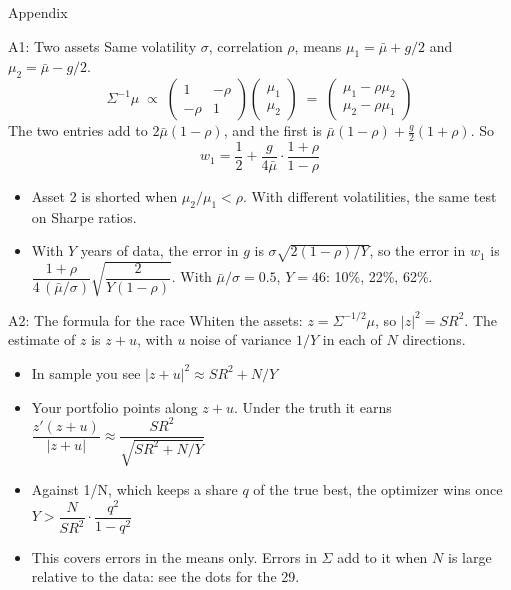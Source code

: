 \documentclass[aspectratio=169,10pt]{beamer}
\begin{document}
\appendix
\begin{frame}
\begin{center}
{\Large Appendix}
\end{center}
\end{frame}

\begin{frame}[label=appendix_two]{A1: Two assets}
Same volatility $\sigma$, correlation $\rho$, means $\mu_{1} = \bar\mu + g/2$ and $\mu_{2} = \bar\mu - g/2$.
\[ \Sigma^{-1}\mu \;\propto\; \begin{pmatrix}1 & -\rho \\ -\rho & 1\end{pmatrix}\begin{pmatrix}\mu_{1} \\ \mu_{2}\end{pmatrix} \;=\; \begin{pmatrix}\mu_{1} - \rho \mu_{2} \\ \mu_{2} - \rho \mu_{1}\end{pmatrix} \]
\vskip 2pt
The two entries add to $2\bar\mu(1-\rho)$, and the first is $\bar\mu(1-\rho) + \tfrac{g}{2}(1+\rho)$. So
\[ w_{1} = \frac{1}{2} + \frac{g}{4\bar\mu}\cdot\frac{1+\rho}{1-\rho} \]
\begin{itemize}
\item Asset 2 is shorted when $\mu_{2}/\mu_{1} < \rho$. With different volatilities, the same test on Sharpe ratios.
\vskip 5pt
\item With $Y$ years of data, the error in $g$ is $\sigma\sqrt{2(1-\rho)/Y}$, so the error in $w_{1}$ is $\dfrac{1+\rho}{4\,(\bar\mu/\sigma)}\sqrt{\dfrac{2}{Y(1-\rho)}}$. With $\bar\mu/\sigma = 0.5$, $Y = 46$: 10\%, 22\%, 62\%.
\end{itemize}
\hfill \hyperlink{amp}{}
\end{frame}

\begin{frame}[label=appendix_formula]{A2: The formula for the race}
Whiten the assets: $z = \Sigma^{-1/2}\mu$, so $|z|^{2} = SR^{2}$. The estimate of $z$ is $z + u$, with $u$ noise of variance $1/Y$ in each of $N$ directions.
\vskip 6pt
\begin{itemize}
\item In sample you see $|z+u|^{2} \approx SR^{2} + N/Y$
\vskip 5pt
\item Your portfolio points along $z + u$. Under the truth it earns $\dfrac{z'(z+u)}{|z+u|} \approx \dfrac{SR^{2}}{\sqrt{SR^{2} + N/Y}}$
\vskip 5pt
\item Against 1/N, which keeps a share $q$ of the true best, the optimizer wins once $Y > \dfrac{N}{SR^{2}}\cdot\dfrac{q^{2}}{1-q^{2}}$
\vskip 5pt
\item This covers errors in the means only. Errors in $\Sigma$ add to it when $N$ is large relative to the data: see the dots for the 29.
\end{itemize}
\hfill \hyperlink{formula}{}
\end{frame}
\end{document}
